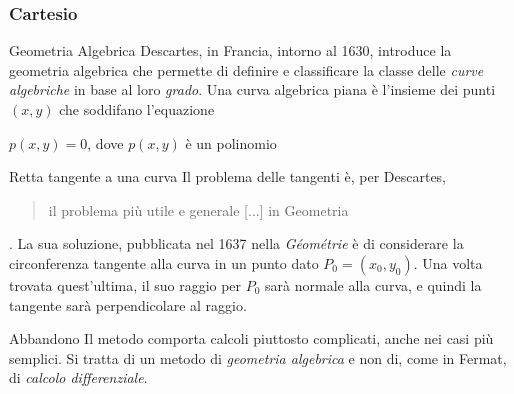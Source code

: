 \begin{frame}[label=Cartesio]
    \frametitle{Cartesio}
    \begin{block}{Geometria Algebrica}
        Descartes, in Francia, intorno al 1630, introduce la \alert{geometria algebrica}
        che permette di definire e classificare la classe delle \textit{curve algebriche}
        in base al loro \textit{grado}.
        Una curva algebrica piana è l'insieme dei punti $(x,y)$ che soddifano l'equazione
        \begin{center}
            $p(x,y) = 0$, dove $p(x,y)$ è un polinomio
        \end{center}
    \end{block}
    \pause
    \begin{block}{Retta tangente a una curva}
        Il problema delle tangenti è, per Descartes, \begin{quote}
            il problema più utile e generale [...] in Geometria
        \end{quote}.
        La sua soluzione, pubblicata nel 1637 nella \textit{Géométrie} è di considerare 
        la circonferenza tangente alla curva in un punto dato $P_0=(x_0,y_0)$. Una volta trovata quest'ultima, il suo
        raggio per $P_0$ sarà normale alla curva, e quindi la tangente sarà
        perpendicolare al raggio.
    \end{block}
    \pause
    \begin{alertblock}{Abbandono}
        Il metodo comporta calcoli piuttosto complicati, anche nei casi più semplici.
        Si tratta di un metodo di \textit{geometria algebrica} e non di, come in Fermat,
        di \textit{calcolo differenziale}. \cite{Bourbaki}
    \end{alertblock}

\end{frame}